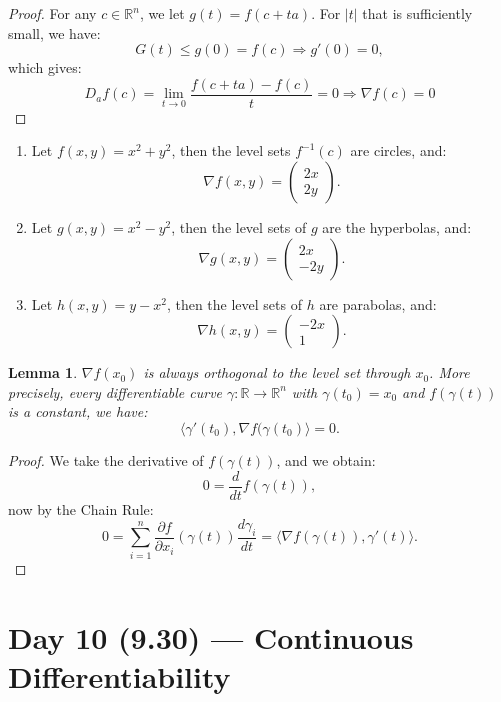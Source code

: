 \documentclass[11pt]{article}
\makeatletter
\newcounter{thmcounter}
\newenvironment{example}[1]{\begin{exbox}{#1}{}}{\end{exbox}}
\theoremstyle{quiet}
\newtheorem{lemma}[thmcounter]{Lemma}
\newtheorem{lemma}[tcb@cnt@defbox]{Lemma}
\theoremstyle{quietremark}
\makeatother
\begin{document}
\begin{proof}
For any $c\in\mathbb{R}^n$, we let $g(t)=f(c+ta)$. For $|t|$ that is sufficiently small, we have:
\[
G(t)\le g(0)=f(c)\Rightarrow g'(0)=0, 
\]
which gives:
\[
D_af(c)=\lim_{t\to 0}\frac{f(c+ta)-f(c)}{t}=0\Rightarrow\nabla f(c)=0
\]
\end{proof}

\begin{example}{}
\begin{enumerate}
\item Let $f(x,y)=x^2+y^2$, then the level sets $f^{-1}(c)$ are circles, and:
\[
\nabla f(x,y)=\begin{pmatrix}2x\\2y\end{pmatrix}.
\]
\item Let $g(x,y)=x^2-y^2$, then the level sets of $g$ are the hyperbolas, and:
\[
\nabla g(x,y)=\begin{pmatrix}2x\\-2y\end{pmatrix}.
\]
\item Let $h(x,y)=y-x^2$, then the level sets of $h$ are parabolas, and:
\[
\nabla h(x,y)=\begin{pmatrix}-2x\\1\end{pmatrix}.
\]
\end{enumerate}
\end{example}

\begin{lemma}
$\nabla f(x_0)$ is always orthogonal to the level set through $x_0$. More precisely, every differentiable curve $\gamma:\mathbb{R}\to\mathbb{R}^n$ with $\gamma(t_0)=x_0$ and $f(\gamma(t))$ is a constant, we have:
\[
\langle\gamma'(t_0),\nabla f(\gamma(t_0)\rangle=0.
\]
\end{lemma}

\begin{proof}
We take the derivative of $f(\gamma(t))$, and we obtain:
\[
0=\frac{d}{dt}f(\gamma(t)),
\]
now by the Chain Rule:
\[
0=\sum_{i=1}^n\frac{\partial f}{\partial x_i}(\gamma(t))\frac{d\gamma_i}{dt}
=\langle\nabla f(\gamma(t)),\gamma'(t)\rangle.\]
\end{proof}

\newpage
\section{Day 10 (9.30) --- Continuous Differentiability}
\end{document}

